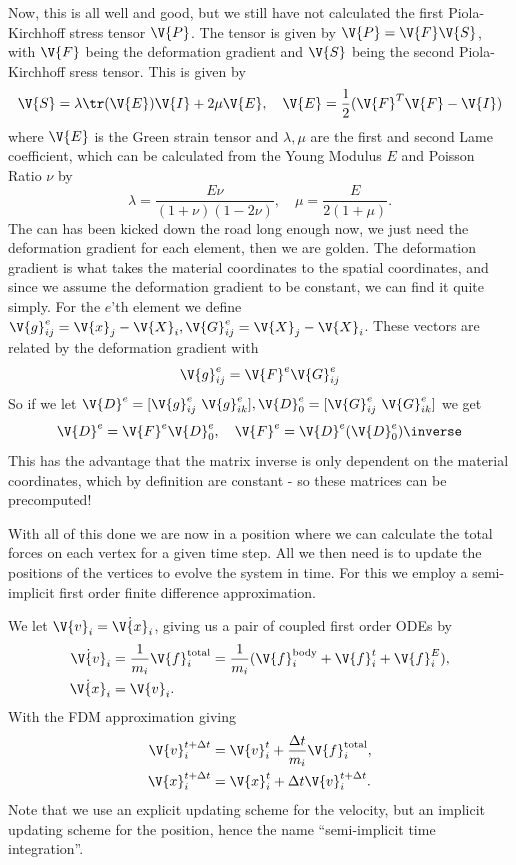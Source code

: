 \documentclass[sigconf]{acmart}
\begin{document}
Now, this is all well and good, but we still have not calculated the first Piola-Kirchhoff stress tensor $ \V{P} $. The tensor is given by $ \V{P} = \V{F}\V{S} $, with $ \V{F} $ being the deformation gradient and $ \V{S} $ being the second Piola-Kirchhoff sress tensor. This is given by
\begin{equation}\label{key}
	\V{S} = \lambda \tr (\V{E}) \V{I} + 2 \mu \V{E}, \quad \V{E} = \frac{1}{2} (\V{F}^T \V{F} - \V{I})
\end{equation}
where $ \V{E} $ is the Green strain tensor and $ \lambda, \mu $ are the first and second Lame coefficient, which can be calculated from the Young Modulus $ E $ and Poisson Ratio $ \nu $ by
\begin{equation}\label{key}
	\lambda = \frac{E\nu}{(1+\nu)(1-2\nu)}, \quad \mu = \frac{E}{2(1+\mu)}.
\end{equation}
The can has been kicked down the road long enough now, we just need the deformation gradient for each element, then we are golden. The deformation gradient is what takes the material coordinates to the spatial coordinates, and since we assume the deformation gradient to be constant, we can find it quite simply. For the $ e $'th element we define $ \V{g}_{ij}^e =\V{x}_j - \V{X}_i,\V{G}_{ij}^e =\V{X}_j - \V{X}_i $. These vectors are related by the deformation gradient with
\begin{equation}\label{key}
	\V{g}_{ij}^e = \V{F}^e \V{G}^e_{ij}
\end{equation}
So if we let $ \V{D}^e = [\V{g}^e_{ij}\ \V{g}^e_{ik}], \V{D}^e_0 =  [\V{G}^e_{ij}\ \V{G}^e_{ik}]$ we get
\begin{equation}\label{key}
	\V{D}^e = \V{F}^e \V{D}^e_0, \quad \V{F}^e = \V{D}^e (\V{D}^e_0)\inverse
\end{equation}
This has the advantage that the matrix inverse is only dependent on the material coordinates, which by definition are constant - so these matrices can be precomputed!

With all of this done we are now in a position where we can calculate the total forces on each vertex for a given time step. All we then need is to update the positions of the vertices to evolve the system in time. For this we employ a semi-implicit first order finite difference approximation.

We let $ \V{v}_i = \dot{\V{x}}_i $, giving us a pair of coupled first order ODEs by
\begin{align}\label{key}
	\dot{\V{v}}_i &= \frac{1}{m_i} \V{f}_i^{\text{total}} = \frac{1}{m_i}(\V{f}^{\text{body}}_i + \V{f}^t_i + \V{f}^E_i), \\
	\dot{\V{x}}_i &= \V{v}_i.
\end{align}
With the FDM approximation giving
\begin{align}\label{key}
	\V{v}_i^{t+\Delta t} &= \V{v}_i^{t} + \frac{\Delta t}{m_i} \V{f}^{\text{total}}_i, \\
	\V{x}_i^{t+\Delta t} &= \V{x}_i^t +\Delta t \V{v}_i^{t+\Delta t}.
\end{align}
Note that we use an explicit updating scheme for the velocity, but an implicit updating scheme for the position, hence the name ``semi-implicit time integration''.
\end{document}
